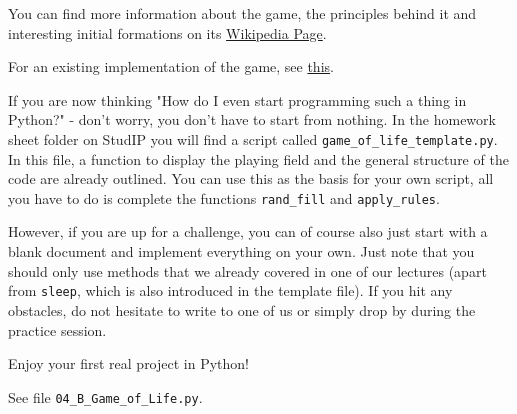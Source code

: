 \noindent You can find more information about the game, the principles behind it and interesting initial formations on its \href{https://en.wikipedia.org/wiki/Conway%27s_Game_of_Life}{Wikipedia Page}.

\vspace{1em}

\noindent For an existing implementation of the game, see \href{https://playgameoflife.com/}{this}.

\vspace{1em}

\noindent If you are now thinking "How do I even start programming such a thing in Python?" - don't worry, you don't have to start from nothing. In the homework sheet folder on StudIP you will find a script called \texttt{game\_of\_life\_template.py}. In this file, a function to display the playing field and the general structure of the code are already outlined. You can use this as the basis for your own script, all you have to do is complete the functions \texttt{rand\_fill} and \texttt{apply\_rules}.

\vspace{1em}

\noindent However, if you are up for a challenge, you can of course also just start with a blank document and implement everything on your own. Just note that you should only use methods that we already covered in one of our lectures (apart from \texttt{sleep}, which is also introduced in the template file). If you hit any obstacles, do not hesitate to write to one of us or simply drop by during the practice session.

\vspace{1em}

\noindent Enjoy your first real project in Python!

\begin{solution}
See file \texttt{04\_B\_Game\_of\_Life.py}.
\end{solution}


